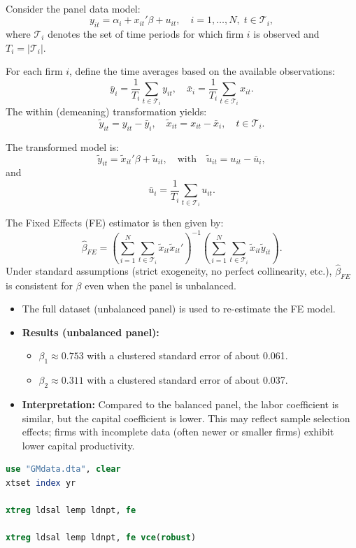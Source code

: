 \documentclass[a4paper,12pt]{article} %
\theoremstyle{nonitalic}
\newenvironment{solution}[1]
  {\renewcommand\theinnercustomsol{#1}\innercustomsol}
  {\endinnercustomsol}
\newcounter{solutionctr}
\renewcommand{\thesolutionctr}{(\alph{solutionctr})}
\newenvironment{autosolution}
  {\stepcounter{solutionctr}\begin{solution}{\thesolutionctr}}
  {\end{solution}}
\begin{document}
\begin{autosolution}
\

Consider the panel data model:
\[
y_{it} = \alpha_i + x_{it}'\beta + u_{it}, \quad i=1,\dots,N,\; t\in \mathcal{T}_i,
\]
where \( \mathcal{T}_i \) denotes the set of time periods for which firm \( i \) is observed and \( T_i = |\mathcal{T}_i| \).

For each firm \( i \), define the time averages based on the available observations:
\[
\bar{y}_i = \frac{1}{T_i}\sum_{t\in \mathcal{T}_i} y_{it}, \quad \bar{x}_i = \frac{1}{T_i}\sum_{t\in \mathcal{T}_i} x_{it}.
\]
The within (demeaning) transformation yields:
\[
\tilde{y}_{it} = y_{it} - \bar{y}_i, \quad \tilde{x}_{it} = x_{it} - \bar{x}_i, \quad t\in \mathcal{T}_i.
\]

The transformed model is:
\[
\tilde{y}_{it} = \tilde{x}_{it}'\beta + \tilde{u}_{it}, \quad \text{with} \quad \tilde{u}_{it} = u_{it} - \bar{u}_i,
\]
and
\[
\bar{u}_i = \frac{1}{T_i}\sum_{t\in \mathcal{T}_i} u_{it}.
\]

The Fixed Effects (FE) estimator is then given by:
\[
\hat{\beta}_{FE} = \left( \sum_{i=1}^{N}\sum_{t\in \mathcal{T}_i} \tilde{x}_{it}\tilde{x}_{it}' \right)^{-1} \left( \sum_{i=1}^{N}\sum_{t\in \mathcal{T}_i} \tilde{x}_{it}\tilde{y}_{it} \right).
\]
Under standard assumptions (strict exogeneity, no perfect collinearity, etc.), \(\hat{\beta}_{FE}\) is consistent for \(\beta\) even when the panel is unbalanced.

\begin{itemize}
    \item The full dataset (unbalanced panel) is used to re-estimate the FE model.
    \item \textbf{Results (unbalanced panel):}
    
    \begin{itemize}
        \item \(\beta_1 \approx 0.753\) with a clustered standard error of about 0.061.
        \item \(\beta_2 \approx 0.311\) with a clustered standard error of about 0.037.
    \end{itemize}
    \item \textbf{Interpretation:} Compared to the balanced panel, the labor coefficient is similar, but the capital coefficient is lower. This may reflect sample selection effects; firms with incomplete data (often newer or smaller firms) exhibit lower capital productivity.
\end{itemize}

\begin{lstlisting}[language=stata]
use "GMdata.dta", clear
xtset index yr
    
xtreg ldsal lemp ldnpt, fe
    
xtreg ldsal lemp ldnpt, fe vce(robust)
    
\end{lstlisting}
\end{autosolution}
\end{document}
